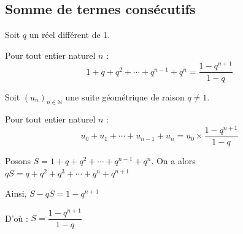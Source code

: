 \documentclass[french]{book}
\newcommand{\N}{\mathbb {N}}
\newcommand{\suite}[1][u]{\left( #1_{n} \right)_{n\in\N}}
\begin{document}
\subsection{Somme de termes consécutifs}
\begin{prop}
Soit $q$ un réel différent de 1.
\par Pour tout entier naturel $n$ :
\[ 1 + q + q^{2} + \cdots + q^{n-1} + q^{n} = \dfrac{1-q^{n+1}}{1-q} \]
\par Soit $\suite[u]$ une suite géométrique de raison $q\neq 1$.
\par Pour tout entier naturel $n$ :
\[u_{0}+u_{1}+ \cdots + u_{n-1}+u_{n}=u_{0}\times\dfrac{1-q^{n+1}}{1-q} \]
\end{prop}

\begin{demo}
\par Posons $S=1 + q + q^{2} + \cdots + q^{n-1} + q^{n}$. On a alors $qS=q + q^{2} + q^{3} + \cdots + q^{n} + q^{n+1}$
\par Ainsi, $S-qS=1-q^{n+1}$
\par D'où : $S=\dfrac{1-q^{n+1}}{1-q}$
\end{demo}
\end{document}

